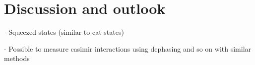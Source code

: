 \chapter{Discussion and outlook}\label{cha:discussion-outlook}

- Squeezed states (similar to cat states) \cite{Pedernales_2023}

- Possible to measure casimir interactions using dephasing and so on with similar methods

